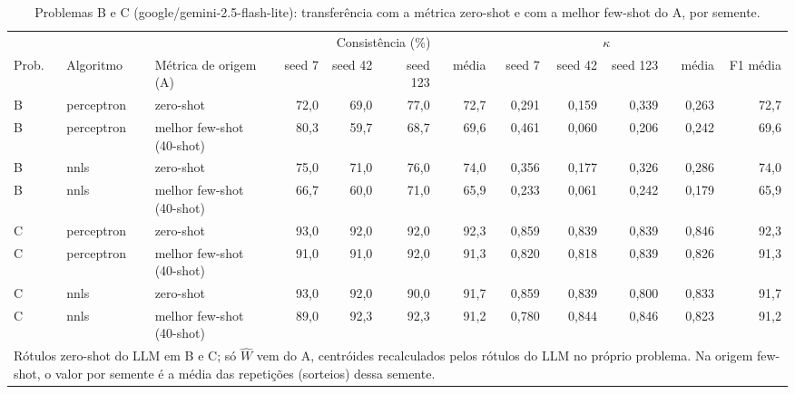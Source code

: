 \begin{table}[htbp]
\centering
\footnotesize
\caption{Problemas B e C (google/gemini-2.5-flash-lite): transferência com a métrica zero-shot e com a melhor few-shot do A, por semente.}
\label{tab:T8_transf_flashlite}
\begin{tabular}{lllrrrrrrrrr}
\toprule
 &  &  & \multicolumn{4}{c}{Consistência (\%)} & \multicolumn{4}{c}{$\kappa$} &  \\ \cmidrule(lr){4-7} \cmidrule(lr){8-11}
Prob. & Algoritmo & Métrica de origem (A) & seed 7 & seed 42 & seed 123 & média & seed 7 & seed 42 & seed 123 & média & F1 média \\
\midrule
B & perceptron & zero-shot & 72,0 & 69,0 & 77,0 & 72,7 & 0,291 & 0,159 & 0,339 & 0,263 & 72,7 \\
B & perceptron & melhor few-shot (40-shot) & 80,3 & 59,7 & 68,7 & 69,6 & 0,461 & 0,060 & 0,206 & 0,242 & 69,6 \\
B & nnls & zero-shot & 75,0 & 71,0 & 76,0 & 74,0 & 0,356 & 0,177 & 0,326 & 0,286 & 74,0 \\
B & nnls & melhor few-shot (40-shot) & 66,7 & 60,0 & 71,0 & 65,9 & 0,233 & 0,061 & 0,242 & 0,179 & 65,9 \\
\midrule
C & perceptron & zero-shot & 93,0 & 92,0 & 92,0 & 92,3 & 0,859 & 0,839 & 0,839 & 0,846 & 92,3 \\
C & perceptron & melhor few-shot (40-shot) & 91,0 & 91,0 & 92,0 & 91,3 & 0,820 & 0,818 & 0,839 & 0,826 & 91,3 \\
C & nnls & zero-shot & 93,0 & 92,0 & 90,0 & 91,7 & 0,859 & 0,839 & 0,800 & 0,833 & 91,7 \\
C & nnls & melhor few-shot (40-shot) & 89,0 & 92,3 & 92,3 & 91,2 & 0,780 & 0,844 & 0,846 & 0,823 & 91,2 \\
\bottomrule
\multicolumn{12}{p{0.95\linewidth}}{\footnotesize Rótulos zero-shot do LLM em B e C; só $\hat{W}$ vem do A, centróides recalculados pelos rótulos do LLM no próprio problema. Na origem few-shot, o valor por semente é a média das repetições (sorteios) dessa semente.} \\
\end{tabular}
\end{table}
